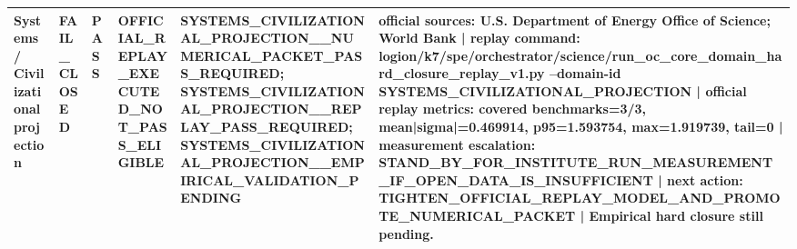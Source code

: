 \begin{longtable}{p{}p{}p{}p{}p{}p{}}
Systems / Civilizational projection & FAIL\_CLOSED & PASS & OFFICIAL\_REPLAY\_EXECUTED\_NOT\_PASS\_ELIGIBLE & SYSTEMS\_CIVILIZATIONAL\_PROJECTION\_\_NUMERICAL\_PACKET\_PASS\_REQUIRED; SYSTEMS\_CIVILIZATIONAL\_PROJECTION\_\_REPLAY\_PASS\_REQUIRED; SYSTEMS\_CIVILIZATIONAL\_PROJECTION\_\_EMPIRICAL\_VALIDATION\_PENDING & official sources: U.S. Department of Energy Office of Science; World Bank | replay command: logion/k7/spe/orchestrator/science/run\_oc\_core\_domain\_hard\_closure\_replay\_v1.py --domain-id SYSTEMS\_CIVILIZATIONAL\_PROJECTION | official replay metrics: covered benchmarks=3/3, mean|sigma|=0.469914, p95=1.593754, max=1.919739, tail=0 | measurement escalation: STAND\_BY\_FOR\_INSTITUTE\_RUN\_MEASUREMENT\_IF\_OPEN\_DATA\_IS\_INSUFFICIENT | next action: TIGHTEN\_OFFICIAL\_REPLAY\_MODEL\_AND\_PROMOTE\_NUMERICAL\_PACKET | Empirical hard closure still pending. \\
\bottomrule
\end{longtable}
